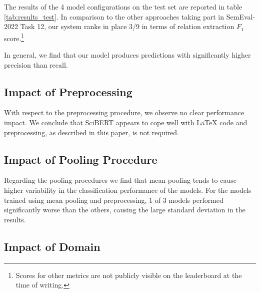 \documentclass[11pt]{article}
\begin{document}
The results of the 4 model configurations on the test set are reported in table \ref{tab:results_test}.
In comparison to the other approaches taking part in SemEval-2022 Task 12, our system ranks in place 3/9 in terms of relation extraction $F_1$ score.\footnote{Scores for other metrics are not publicly visible on the leaderboard at the time of writing.}

In general, we find that our model produces predictions with significantly higher precision than recall.

\subsection{Impact of Preprocessing}
With respect to the preprocessing procedure, we observe no clear performance impact.
We conclude that SciBERT appears to cope well with LaTeX code and preprocessing, as described in this paper, is not required.
\subsection{Impact of Pooling Procedure}
Regarding the pooling procedures we find that mean pooling tends to cause higher variability in the classification performance of the models.
For the models trained using mean pooling and preprocessing, 1 of 3 models performed significantly worse than the others, causing the large standard deviation in the results.

\subsection{Impact of Domain}

\begin{table}
\centering
{}
\caption{\label{tab:domain_re} F1 scores for relation extraction across different domains and relation types on the development set. cs and econ do not contain any instances of "Count".}
\end{table}
\end{document}
